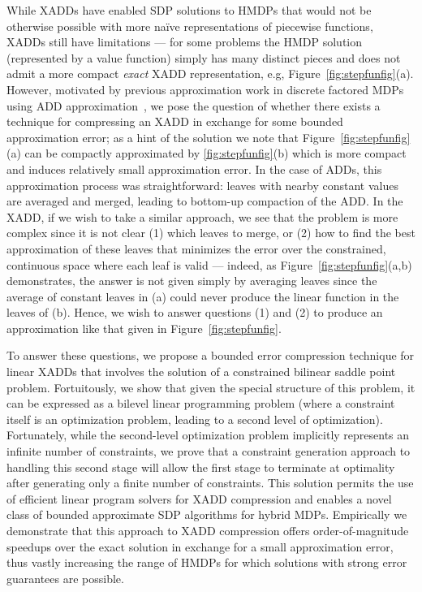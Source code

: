 While XADDs have enabled SDP solutions to HMDPs that would not be
otherwise possible with more na\"{i}ve representations of piecewise
functions, XADDs still have limitations --- for some problems the HMDP
solution (represented by a value function) simply has many distinct
pieces and does not admit a more compact \emph{exact} XADD
representation, e.g, Figure~\ref{fig:stepfunfig}(a).  However,
motivated by previous approximation work in discrete factored MDPs
using ADD approximation~\cite{apricodd}, we pose the question of
whether there exists a technique for compressing an XADD in exchange
for some bounded approximation error; as a hint of the solution we
note that Figure~\ref{fig:stepfunfig}(a) can be compactly approximated
by \ref{fig:stepfunfig}(b) which is more compact and induces
relatively small approximation error.  In the case of ADDs, this
approximation process was straightforward: leaves with nearby constant
values are averaged and merged, leading to bottom-up compaction of the
ADD.  In the XADD, if we wish to take a similar approach, we see that
the problem is more complex since it is not clear (1) which leaves to
merge, or (2) how to find the best approximation of these leaves that
minimizes the error over the constrained, continuous space where each
leaf is valid --- indeed, as Figure~\ref{fig:stepfunfig}(a,b)
demonstrates, the answer is not given simply by averaging leaves since
the average of constant leaves in (a) could never produce the linear
function in the leaves of (b).  Hence, we wish to answer questions (1)
and (2) to produce an approximation like that given in
Figure~\ref{fig:stepfunfig}.

To answer these questions, we propose a bounded error compression
technique for linear XADDs that involves the solution of a constrained
bilinear saddle point problem.  Fortuitously, we show that given the
special structure of this problem, it can be expressed as a bilevel
linear programming problem (where a constraint itself is an
optimization problem, leading to a second level of optimization).
Fortunately, while the second-level optimization problem implicitly
represents an infinite number of constraints, we prove that a
constraint generation approach to handling this second stage will
allow the first stage to terminate at optimality after generating only
a finite number of constraints.  This solution permits the use of
efficient linear program solvers for XADD compression and enables a
novel class of bounded approximate SDP algorithms for hybrid MDPs.
Empirically we demonstrate that this approach to XADD compression
offers order-of-magnitude speedups over the exact solution in exchange
for a small approximation error, thus vastly increasing the range of
HMDPs for which solutions with strong error guarantees are possible.

